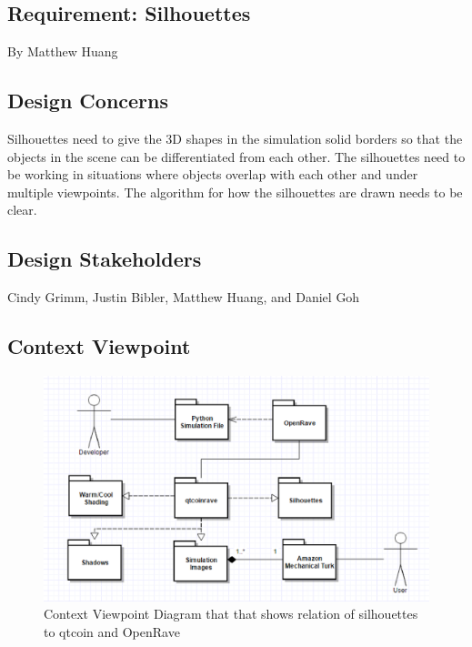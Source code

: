 ﻿\documentclass[10pt,journal,compsoc,draftclsnofoot]{IEEEtran}
\begin{document}
\begin{flushleft}
\newpage

\section{Requirement: Silhouettes}
\large{By Matthew Huang}

\normalsize
\subsection{Design Concerns}
Silhouettes need to give the 3D shapes in the simulation solid borders so that the objects in the scene can be differentiated from each other.
The silhouettes need to be working in situations where objects overlap with each other and under multiple viewpoints. 
The algorithm for how the silhouettes are drawn needs to be clear.

\subsection{Design Stakeholders}
Cindy Grimm, Justin Bibler, Matthew Huang, and Daniel Goh

\subsection{Context Viewpoint}

\begin{figure} [H]
  \includegraphics[scale=0.8]{Silhouettes_context.eps}
  \caption
{ \newline \hspace{\linewidth}
Context Viewpoint Diagram that that shows relation of silhouettes to qtcoin and OpenRave}
  \label{fig:Silhouettes_context}
\end{figure}


\end{flushleft}
\end{document}
